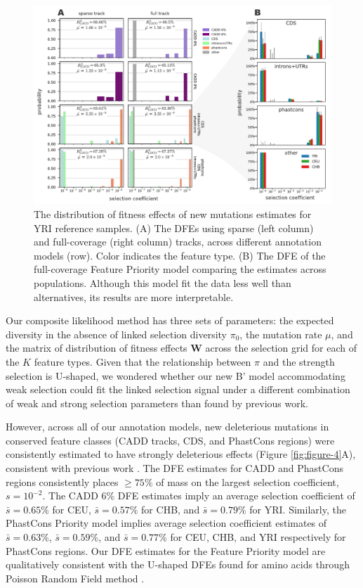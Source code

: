 \documentclass[11pt]{article}
\begin{document}
\begin{figure}[htbp] \centering
    \includegraphics[width=\textwidth]{figures/figure_4.pdf} 

    \caption{The distribution of fitness effects of new mutations estimates for
        YRI reference samples. (A) The DFEs using sparse (left column) and
        full-coverage (right column) tracks, across different annotation models
        (row). Color indicates the feature type. (B) The DFE of the
    full-coverage Feature Priority model comparing the estimates across
populations. Although this model fit the data less well than alternatives, its
results are more interpretable.}

  \label{fig:figure-3}
\end{figure}

Our composite likelihood method has three sets of parameters: the expected
diversity in the absence of linked selection diversity $\pi_0$, the mutation
rate $\mu$, and the matrix of distribution of fitness effects $\mathbf{W}$
across the selection grid for each of the $K$ feature types. Given that the
relationship between $\pi$ and the strength selection is U-shaped, we wondered
whether our new B' model accommodating weak selection could fit the linked
selection signal under a different combination of weak and strong selection
parameters than found by previous work.

However, across all of our annotation models, new deleterious mutations in
conserved feature classes (CADD tracks, CDS, and PhastCons regions) were
consistently estimated to have strongly deleterious effects (Figure
\ref{fig:figure-4}A), consistent with previous work
\parencite{McVicker2009-ax,Murphy2022-sj}. The DFE estimates for CADD and
PhastCons regions consistently places $\ge 75\%$ of mass on the largest
selection coefficient, $s=10^{-2}$. The CADD 6\% DFE estimates imply an average
selection coefficient of $\bar{s} = 0.65\%$ for CEU, $\bar{s} = 0.57\%$ for
CHB, and $\bar{s} = 0.79\%$ for YRI. Similarly, the PhastCons Priority model
implies average selection coefficient estimates of $\bar{s} = 0.63\%$, $\bar{s}
= 0.59\%$, and $\bar{s}= 0.77\%$ for CEU, CHB, and YRI respectively for
PhastCons regions. Our DFE estimates for the Feature Priority model are
qualitatively consistent with the U-shaped DFEs found for amino acids through
Poisson Random Field method \parencite{Boyko2008-tj}.
\end{document}
